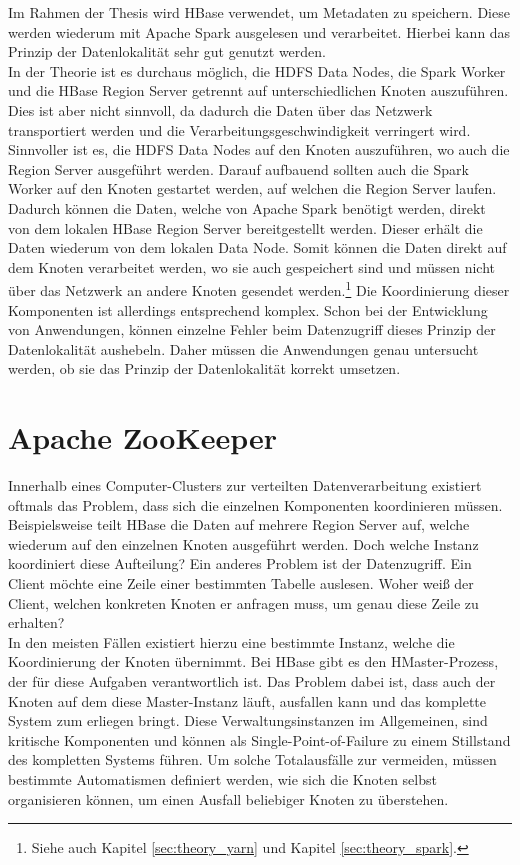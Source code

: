 \noindent
Im Rahmen der Thesis wird HBase verwendet, um Metadaten zu speichern. Diese werden wiederum mit Apache Spark ausgelesen und verarbeitet. Hierbei kann das Prinzip der Datenlokalität sehr gut genutzt werden.\\
In der Theorie ist es durchaus möglich, die HDFS Data Nodes, die Spark Worker und die HBase Region Server getrennt auf unterschiedlichen Knoten auszuführen. Dies ist aber nicht sinnvoll, da dadurch die Daten über das Netzwerk transportiert werden und die Verarbeitungsgeschwindigkeit verringert wird.\\
Sinnvoller ist es, die HDFS Data Nodes auf den Knoten auszuführen, wo auch die Region Server ausgeführt werden. Darauf aufbauend sollten auch die Spark Worker auf den Knoten gestartet werden, auf welchen die Region Server laufen. Dadurch können die Daten, welche von Apache Spark benötigt werden, direkt von dem lokalen HBase Region Server bereitgestellt werden. Dieser erhält die Daten wiederum von dem lokalen Data Node. Somit können die Daten direkt auf dem Knoten verarbeitet werden, wo sie auch gespeichert sind und müssen nicht über das Netzwerk an andere Knoten gesendet werden.\footnote{Siehe auch Kapitel \ref{sec:theory_yarn} und Kapitel \ref{sec:theory_spark}.} Die Koordinierung dieser Komponenten ist allerdings entsprechend komplex. Schon bei der Entwicklung von Anwendungen, können einzelne Fehler beim Datenzugriff dieses Prinzip der Datenlokalität aushebeln. Daher müssen die Anwendungen genau untersucht werden, ob sie das Prinzip der Datenlokalität korrekt umsetzen.\\

\section{Apache ZooKeeper}
\label{sec:theory_zookeeper}

Innerhalb eines Computer-Clusters zur verteilten Datenverarbeitung existiert oftmals das Problem, dass sich die einzelnen Komponenten koordinieren müssen. Beispielsweise teilt HBase die Daten auf mehrere Region Server auf, welche wiederum auf den einzelnen Knoten ausgeführt werden. Doch welche Instanz koordiniert diese Aufteilung? Ein anderes Problem ist der Datenzugriff. Ein Client möchte eine Zeile einer bestimmten Tabelle auslesen. Woher weiß der Client, welchen konkreten Knoten er anfragen muss, um genau diese Zeile zu erhalten?\\ 

\noindent
In den meisten Fällen existiert hierzu eine bestimmte Instanz, welche die Koordinierung der Knoten übernimmt. Bei HBase gibt es den HMaster-Prozess, der für diese Aufgaben verantwortlich ist. Das Problem dabei ist, dass auch der Knoten auf dem diese Master-Instanz läuft, ausfallen kann und das komplette System zum erliegen bringt. Diese Verwaltungsinstanzen im Allgemeinen, sind kritische Komponenten und können als Single-Point-of-Failure zu einem Stillstand des kompletten Systems führen. Um solche Totalausfälle zur vermeiden, müssen bestimmte Automatismen definiert werden, wie sich die Knoten selbst organisieren können, um einen Ausfall beliebiger Knoten zu überstehen.\\

